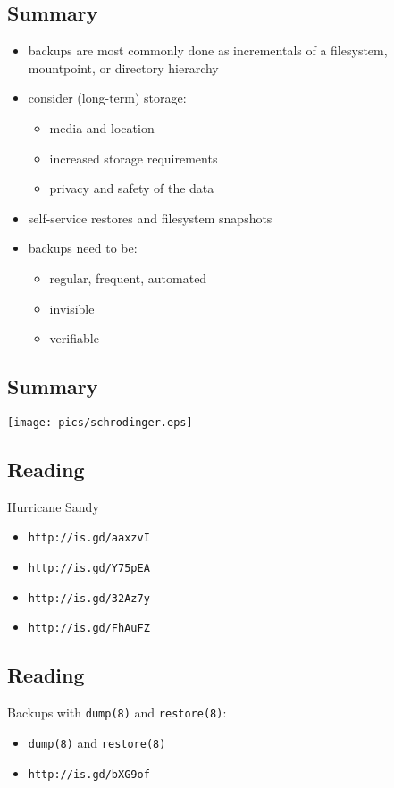 \documentclass[xga]{xdvislides}
\begin{document}
\subsection{Summary}
\begin{itemize}
	\item backups are most commonly done as incrementals
		of a filesystem, mountpoint, or directory hierarchy
	\item consider (long-term) storage:
		\begin{itemize}
			\item media and location
			\item increased storage requirements
			\item privacy and safety of the data
		\end{itemize}
	\item self-service restores and filesystem snapshots
	\item backups need to be:
		\begin{itemize}
			\item regular, frequent, automated
			\item invisible
			\item verifiable
		\end{itemize}
\end{itemize}

\subsection{Summary}
\vspace*{\fill}
\begin{center}
	\texttt{[image: pics/schrodinger.eps]}
\end{center}
\vspace*{\fill}

\subsection{Reading}
Hurricane Sandy
\begin{itemize}
	\item \verb+http://is.gd/aaxzvI+
	\item \verb+http://is.gd/Y75pEA+
	\item \verb+http://is.gd/32Az7y+
	\item \verb+http://is.gd/FhAuFZ+
\end{itemize}

\subsection{Reading}
Backups with {\tt dump(8)} and {\tt restore(8)}:
\begin{itemize}
	\item \verb+dump(8)+ and \verb+restore(8)+
	\item \verb+http://is.gd/bXG9of+
\end{itemize}
\vspace{.5in}
\end{document}
